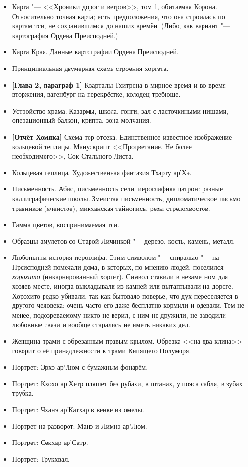 \documentclass[a4paper,10pt,fleqn]{book}
\begin{document}
\begin{itemize}
\item Карта "--- <<Хроники дорог и ветров>>, том 1, обитаемая Корона.
Относительно точная карта;
есть предположения, что она строилась по картам тси, не сохранившимся до наших времён.
(Либо, как вариант "--- картография Ордена Преисподней.)
\item Карта Края.
Данные картографии Ордена Преисподней.
\item Принципиальная двумерная схема строения хоргета.
\item \textbf{[Глава 2, параграф 1]}
Кварталы Тхитрона в мирное время и во время вторжения, вагенбург на перекрёстке, колодец-требюше.
\item Устройство храма.
Казармы, школа, гонги, зал с ласточкиными нишами, операционный балкон, крипта, зона молчания.
\item \textbf{[Отчёт Хомяка]}
Схема тор-отсека.
Единственное известное изображение кольцевой теплицы.
Манускрипт <<Процветание. Не более необходимого>>, Сок-Стального-Листа.
\item Кольцевая теплица.
Художественная фантазия Тхарту ар'Хэ.
\item Письменность.
Абис, письменность сели, иероглифика цатрон: разные каллиграфические школы.
Змеистая письменность, дипломатическое письмо травников (ячеистое), микханская тайнопись, резы стрелохвостов.
\item Гамма цветов, воспринимаемая тси.
\item Образцы амулетов со Старой Личинкой "--- дерево, кость, камень, металл.
\item Любопытна история иероглифа.
Этим символом "--- спиралью "--- на Преисподней помечали дома, в которых, по мнению людей, поселился \textit{хорохито} (инкарнированный хоргет).
Символ ставили в незаметном для хозяев месте, иногда выкладывали из камней или вытаптывали на дороге.
Хорохито редко убивали, так как бытовало поверье, что дух переселяется в другого человека;
очень часто его даже бесплатно кормили и одевали.
Тем не менее, подозреваемому никто не верил, с ним не дружили, не заводили любовные связи и вообще старались не иметь никаких дел.
\item Женщина-трами с обрезанным правым крылом.
Обрезка <<на два клина>> говорит о её принадлежности к трами Кипящего Полуморя.
\item Портрет: Эрхэ ар'Люм с бумажным фонарём.
\item Портрет: Кхохо ар'Хетр пляшет без рубахи, в штанах, у пояса сабля, в зубах трубка.
\item Портрет: Чханэ ар'Катхар в венке из омелы.
\item Портрет на разворот: Манэ и Лимнэ ар'Люм.
\item Портрет: Секхар ар'Сатр.
\item Портрет: Трукхвал.
\end{itemize}
\end{document}
